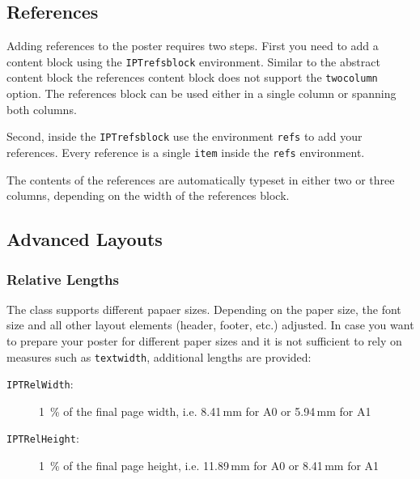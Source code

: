 

\subsection{References}

Adding references to the poster requires two steps. First you need to add a content block using the \texttt{IPTrefsblock} environment. Similar to the abstract content block the references content block does not support the \texttt{twocolumn} option. The references block can be used either in a single column or spanning both columns.

Second, inside the \texttt{IPTrefsblock} use the environment \texttt{refs} to add your references. Every reference is a single \texttt{\bs{}item} inside the \texttt{refs} environment. 

The contents of the references are automatically typeset in either two or three columns, depending on the width of the references block.


\subsection{Advanced Layouts}

\subsubsection{Relative Lengths}

The \tugPoster{} class supports different papaer sizes. Depending on the paper size, the font size and all other layout elements (header, footer, etc.) adjusted. In case you want to prepare your poster for different paper sizes and it is not sufficient to rely on measures such as \texttt{\bs{}textwidth}, additional lengths are provided:

\begin{description}
	\item[\texttt{IPTRelWidth}:] 1~\% of the final page width, i.e. 8.41\,mm for A0 or 5.94\,mm for A1
	\item[\texttt{IPTRelHeight}:] 1~\% of the final page height, i.e. 11.89\,mm for A0 or 8.41\,mm for A1
\end{description}

